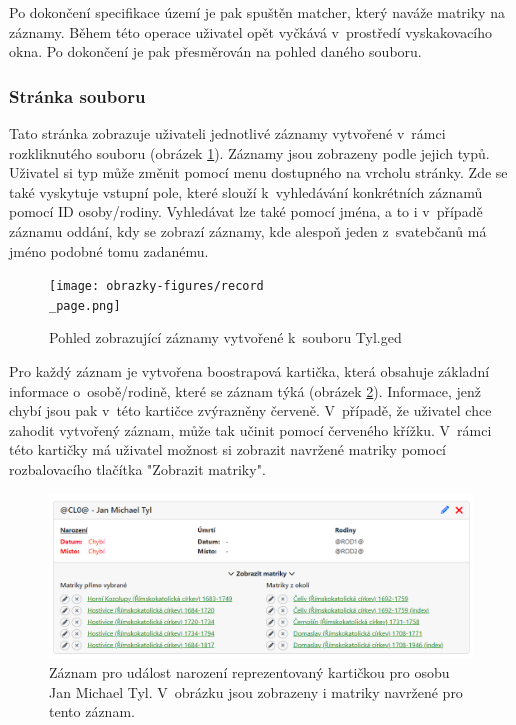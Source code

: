 Po dokončení specifikace území je pak spuštěn matcher, který naváže matriky na záznamy. Během této operace uživatel opět vyčkává v~prostředí vyskakovacího okna. Po dokončení je pak přesměrován na pohled daného souboru.

\subsubsection{Stránka souboru}
Tato stránka zobrazuje uživateli jednotlivé záznamy vytvořené v~rámci rozkliknutého souboru (obrázek \ref{figure_record_page}). Záznamy jsou zobrazeny podle jejich typů. Uživatel si typ může změnit pomocí menu dostupného na vrcholu stránky. Zde se také vyskytuje vstupní pole, které slouží k~vyhledávání konkrétních záznamů pomocí ID osoby/rodiny. Vyhledávat lze také pomocí jména, a to i v~případě záznamu oddání, kdy se zobrazí záznamy, kde alespoň jeden z~svatebčanů má jméno podobné tomu zadanému. 

\begin{figure}[H]
	\centering
	\texttt{[image: obrazky-figures/record\\\_page.png]}
	\caption[Pohled zobrazující záznamy]{Pohled zobrazující záznamy vytvořené k~souboru Tyl.ged}
	\label{figure_record_page}
\end{figure}

Pro každý záznam je vytvořena boostrapová kartička, která obsahuje základní informace o~osobě/rodině, které se záznam týká (obrázek \ref{figure_card}). Informace, jenž chybí jsou pak v~této kartičce zvýrazněny červeně. V~případě, že uživatel chce zahodit vytvořený záznam, může tak učinit pomocí červeného křížku. V~rámci této kartičky má uživatel možnost si zobrazit navržené matriky pomocí rozbalovacího tlačítka "Zobrazit matriky".

\begin{figure}[H]
	\centering
	\includegraphics[width=140mm]{obrazky-figures/cards.png}
	\caption[Záznam pro událost narození reprezentovaný kartičkou]{Záznam pro událost narození reprezentovaný kartičkou pro osobu Jan Michael Tyl. V~obrázku jsou zobrazeny i matriky navržené pro tento záznam.}
	\label{figure_card}
\end{figure}

